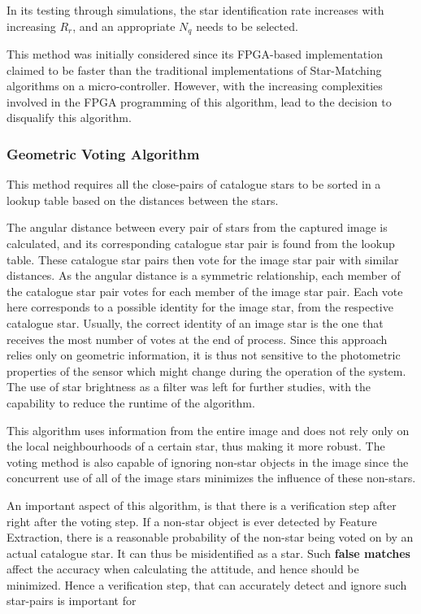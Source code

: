 \documentclass[../../main.tex]{subfiles}
\begin{document}
In its testing through simulations, the star identification rate increases with increasing $R_r$, and an appropriate $N_q$ needs to be selected.

This method was initially considered since its FPGA-based implementation \cite{zhao2017real} claimed to be faster than the traditional implementations of Star-Matching algorithms on a micro-controller. However, with the increasing complexities involved in the FPGA programming of this algorithm, lead to the decision to disqualify this algorithm.


\subsubsection{Geometric Voting Algorithm}
\label{sec:GVA}
This method \cite{kolomenkin2008geometric} requires all the close-pairs of catalogue stars to be sorted in a lookup table based on the distances between the stars.

The angular distance between every pair of stars from the captured image is calculated, and its corresponding catalogue star pair is found from the lookup table. These catalogue star pairs then vote for the image star pair with similar distances. As the angular distance is a symmetric relationship, each member of the catalogue star pair votes for each member of the image star pair. 
Each vote here corresponds to a possible identity for the image star, from the respective catalogue star. Usually, the correct identity of an image star is the one that receives the most number of votes at the end of process. Since this approach relies only on geometric information, it is thus not sensitive to the photometric properties of the sensor which might change during the operation of the system.
The use of star brightness as a filter was left for further studies, with the capability to reduce the runtime of the algorithm.

This algorithm uses information from the entire image and does not rely only on the local neighbourhoods of a certain star, thus making it more robust. The voting method is also capable of ignoring non-star objects in the image since the concurrent use of all of the image stars minimizes the influence of these non-stars.


An important aspect of this algorithm, is that there is a verification step after right after the voting step. 
If a non-star object is ever detected by Feature Extraction, there is a reasonable probability of the non-star being voted on by an actual catalogue star. It can thus be misidentified as a star. Such \textbf{false matches} affect the accuracy when calculating the attitude, and hence should be minimized. Hence a verification step, that can accurately detect and ignore such star-pairs is important for 
\end{document}
